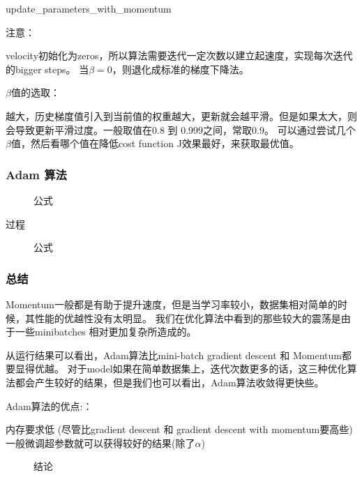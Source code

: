 \documentclass[UTF8]{ctexart}
\begin{document}
update\_parameters\_with\_momentum

注意：

velocity初始化为zeros，所以算法需要迭代一定次数以建立起速度，实现每次迭代的bigger steps。
当$\beta=0$，则退化成标准的梯度下降法。

$\beta$值的选取：

 越大，历史梯度值引入到当前值的权重越大，更新就会越平滑。但是如果太大，则会导致更新平滑过度。一般取值在0.8 到 0.999之间，常取0.9。
 可以通过尝试几个$\beta$值，然后看哪个值在降低cost function J效果最好，来获取最优值。

\subsubsection{Adam 算法}

\begin{figure}[htb]
 \caption{公式}
  \label{fig:31}
 \end{figure}

过程
\begin{figure}[htb]
 \caption{公式}
  \label{fig:32}
 \end{figure}

\subsubsection{总结}
Momentum一般都是有助于提升速度，但是当学习率较小，数据集相对简单的时候，其性能的优越性没有太明显。
我们在优化算法中看到的那些较大的震荡是由于一些minibatches 相对更加复杂所造成的。

从运行结果可以看出，Adam算法比mini-batch gradient descent 和 Momentum都要显得优越。
对于model如果在简单数据集上，迭代次数更多的话，这三种优化算法都会产生较好的结果，但是我们也可以看出，Adam算法收敛得更快些。

Adam算法的优点:：

内存要求低 (尽管比gradient descent 和 gradient descent with momentum要高些)
一般微调超参数就可以获得较好的结果(除了$\alpha$)

\begin{figure}[htb]
 \caption{结论}
  \label{fig:33}
 \end{figure}
\end{document}
